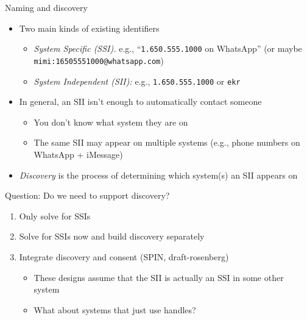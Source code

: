 \documentclass[helvetica]{beamer}
\begin{document}
\begin{frame}{Naming and discovery}

  \begin{itemize}
  \item Two main kinds of existing identifiers
    \begin{itemize}
    \item \emph{System Specific (SSI).} e.g., ``\texttt{1.650.555.1000} on WhatsApp''
      (or maybe \texttt{mimi:16505551000@whatsapp.com})
    \item \emph{System Independent (SII):} e.g., \texttt{1.650.555.1000} or \texttt{ekr}
    \end{itemize}
  \item In general, an SII isn't enough to automatically contact someone
    \begin{itemize}
    \item You don't know what system they are on
    \item The same SII may appear on multiple systems (e.g., phone numbers on WhatsApp + iMessage)
    \end{itemize}
  \item \emph{Discovery} is the process of determining which system(s) an SII appears on
  \end{itemize}
\end{frame}

\begin{frame}{Question: Do we need to support discovery?}
  
  \begin{enumerate}
    \item Only solve for SSIs
    \item Solve for SSIs now and build discovery separately
    \item Integrate discovery and consent (SPIN, draft-rosenberg)
      \begin{itemize}
      \item These designs assume that the SII is actually an SSI in some other system
      \item What about systems that just use handles?
      \end{itemize}
  \end{enumerate}      
\end{frame}
\end{document}
